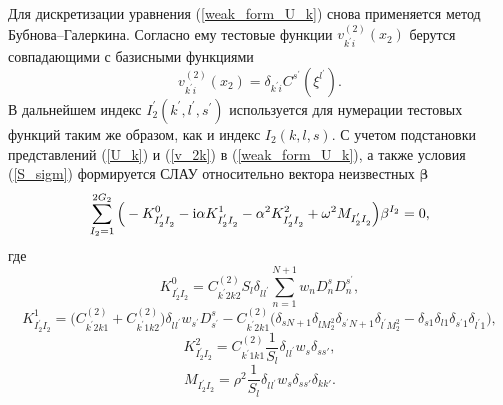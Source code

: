 \documentclass[press]{vestnik}
\begin{document}
Для дискретизации уравнения (\ref{weak_form_U_k}) снова применяется метод Бубнова–Галеркина. Согласно ему тестовые функции $v_{k^{'}i}^{(2)}({x_2})$ берутся совпадающими с базисными функциями
\begin{equation} \label{v_2k}
	v_{k^{'}i}^{(2)}(x_2) = \delta_{k^{'}i} C^{s^{'}}(\xi^{l^{'}}).
\end{equation}
В дальнейшем индекс $I_{2}^{'}(k^{'},l^{'},s^{'})$ используется для нумерации тестовых функций таким же образом, как и индекс $I_{2}(k,l,s)$. 
С учетом подстановки представлений (\ref{U_k}) и (\ref{v_2k}) в (\ref{weak_form_U_k}), а также условия (\ref{S_sigm}) формируется СЛАУ относительно вектора неизвестных $\bm{\beta}$
\begin{equation} \label{Slau_2}
\sum_{I_2=1}^{2G_2} \Big( -K_{I_{2}^{'} I_{2}^{}}^{0} - {\rm{i}} \alpha K_{I_{2}^{'} I_{2}^{}}^{1} - \alpha^{2} K_{I_{2}^{'} I_{2}^{}}^{2} + \omega^{2} M_{I_{2}^{'} I_{2}^{}} \Big) \beta^{I_2} = 0,
\end{equation}
где
$$
K_{I_{2}^{'} I_{2}^{}}^{0} = C_{k^{'}2k2}^{(2)} S_{l} \delta_{l^{} l^{'}} \sum_{n=1}^{N+1} w_{n} D_{n}^{s} D_{n}^{s^{'}},
$$
\begin{equation*}
		K_{I_{2}^{'} I_{2}^{}}^{1} = \Big( C_{k^{'}2k1}^{(2)} + C_{k^{'}1k2}^{(2)} \Big) \delta_{l^{} l^{'}} w_{s^{'}} D_{s^{'}}^{s} - 
		C_{k^{'}2k1}^{(2)} \Big( \delta_{s N+1} \delta_{l M_{2}^{2}} \delta_{s^{'} N+1} \delta_{l^{'} M_{2}^{2}} - \delta_{s 1} \delta_{l 1} \delta_{s^{'} 1} \delta_{l^{'} 1} \Big),
\end{equation*}
$$
K_{I_{2}^{'} I_{2}^{}}^{2} = C_{k^{'}1k1}^{(2)} \frac{1}{S_{l}}  \delta_{l^{} l^{'}} w_{s} \delta_{s s{'}},
$$
$$
M_{I_{2}^{'} I_{2}^{}} = \rho^{2} \frac{1}{S_{l}}  \delta_{l^{} l^{'}} w_{s} \delta_{s s{'}} \delta_{k k{'}}.
$$
\end{document}
